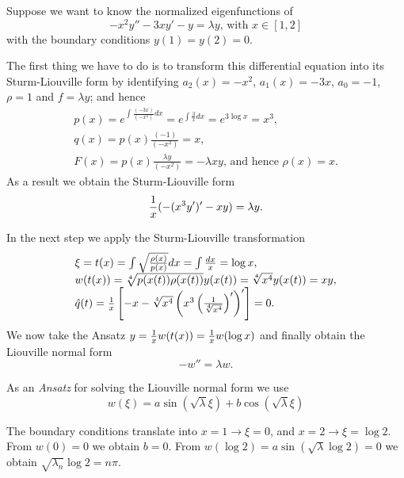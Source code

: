 {
\color{blue}
\bexample

Suppose we want to know the normalized eigenfunctions of
\begin{equation}
-x^2y'' - 3xy' - y = \lambda y \textrm{, with } x\in [1,2]
\end{equation}
with the boundary conditions $y(1) = y(2) =0$.

The first thing we have to do is to  transform this differential equation
into its Sturm-Liouville form by identifying $a_2(x)=-x^2$,
$a_1(x)=  - 3x$, $a_0 =-1$, $\rho = 1$ and $f =\lambda y$; and hence
\begin{equation}
\begin{array}  {l}
p(x)=e^{\int \frac{(-  3x)}{(-x^2)} dx}=e^{\int \frac{3}{x} dx}=e^{3\log{x}}=x^3,\\
q(x)=p(x) \frac{(-1)}{(-x^2)}= x,\\
F(x)=p(x) \frac{\lambda y}{(-x^2)}= -\lambda x y\textrm{, and hence } \rho(x)= x
.
\end{array}
\end{equation}
As a result we obtain the  Sturm-Liouville form
\begin{equation}
{1\over x}(-(x^3y')'-xy)=\lambda y .
\end{equation}

In the next step we apply the Sturm-Liouville transformation
\begin{equation}
\begin{array}  {l}
\xi= t (x)  =\int\sqrt{\rho (x)\over p(x)}dx=\int{dx\over x}=\log x,\\
w(t(x))=\sqrt[4]{p(x(t))\rho(x(t))} y (x(t))= \sqrt[4]{x^4} y (x(t))= x y,\\
\hat{q}(t)= \frac{1}{x}\left[-x -\sqrt[4]{x^4 }
\left(x^3\left( \frac{1}{\sqrt[4]{x^4 }}\right)'\right)'\right] =0
.
\end{array}
\end{equation}
We now take the {Ansatz} $y={1\over x} w ( t (x))={1\over x} w (\log x)$
and finally obtain  the Liouville normal form
\begin{equation}
- w ''=\lambda  w .
\end{equation}

As an {\em Ansatz}
for solving the Liouville normal form we use
\begin{equation}   w (\xi)=a\sin(\sqrt{\lambda}\xi)+b\cos(\sqrt{\lambda}\xi)
\end{equation}

The boundary conditions translate into $x=1\rightarrow\xi=0$,
and $x=2\rightarrow \xi=\log 2$.
From
$w (0)=0$ we obtain $b=0$.
From
$w (\log 2)=a\sin(\sqrt{\lambda}\log2)=0$
we obtain
$\sqrt{\lambda_n}\log2=n\pi$.

}
